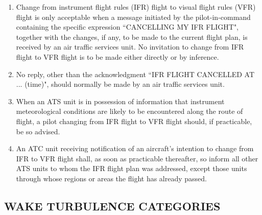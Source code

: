 \documentclass[../main.tex]{subfiles}
\begin{document}
    \begin{enumerate}[label=\arabic{section}.\arabic{subsection}.\arabic*]
        \item Change from instrument flight rules (IFR) flight to visual flight rules (VFR) flight is only acceptable when a message initiated by the pilot-in-command containing the specific expression ``CANCELLING MY IFR FLIGHT", together with the changes, if any, to be made to the current flight plan, is received by an air traffic services unit. No invitation to change from IFR flight to VFR flight is to be made either directly or by inference.
        \item No reply, other than the acknowledgment ``IFR FLIGHT CANCELLED AT ... (time)", should normally be made by an air traffic services unit.
        \item When an ATS unit is in possession of information that instrument meteorological conditions are likely to be encountered along the route of flight, a pilot changing from IFR flight to VFR flight should, if practicable, be so advised.


        \item An ATC unit receiving notification of an aircraft's intention to change from IFR to VFR flight shall, as soon as practicable thereafter, so inform all other ATS units to whom the IFR flight plan was addressed, except those units through whose regions or areas the flight has already passed.
    \end{enumerate}

    \subsection[Wake turbulence categories]{WAKE TURBULENCE CATEGORIES}

    \begin{enumempty}[labelindent=\parindent]
        \item {}
    \end{enumempty}
\end{document}
